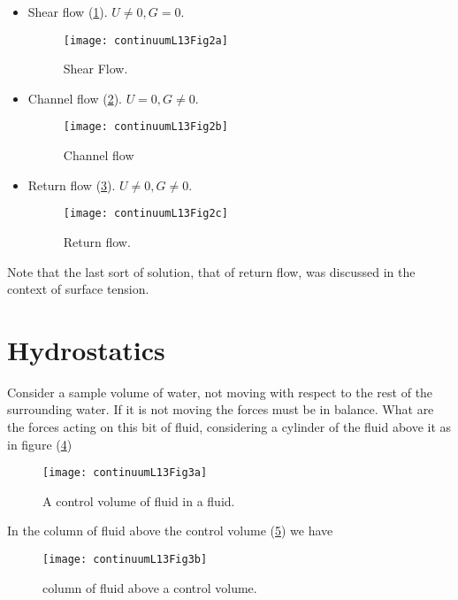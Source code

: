 \begin{itemize}
\item 
Shear flow (\ref{fig:continuumL13:continuumL13Fig2a}).  $U \ne 0, G = 0$.
\begin{figure}[htp]
   \centering
   \texttt{[image: continuumL13Fig2a]}
   \caption{Shear Flow.}\label{fig:continuumL13:continuumL13Fig2a}
\end{figure}
\item Channel flow (\ref{fig:continuumL13:continuumL13Fig2b}).  $U = 0, G \ne 0$.
\begin{figure}[htp]
   \centering
   \texttt{[image: continuumL13Fig2b]}
   \caption{Channel flow}\label{fig:continuumL13:continuumL13Fig2b}
\end{figure}
\item Return flow (\ref{fig:continuumL13:continuumL13Fig2c}).  $U \ne 0, G \ne 0$.
\begin{figure}[htp]
   \centering
   \texttt{[image: continuumL13Fig2c]}
   \caption{Return flow.}\label{fig:continuumL13:continuumL13Fig2c}
\end{figure}
\end{itemize}

Note that the last sort of solution, that of return flow, was discussed in the context of surface tension.

\section{Hydrostatics}

Consider a sample volume of water, not moving with respect to the rest of the surrounding water.  If it is not moving the forces must be in balance.  What are the forces acting on this bit of fluid, considering a cylinder of the fluid above it as in figure (\ref{fig:continuumL13:continuumL13Fig3a})
\begin{figure}[htp]
   \centering
   \texttt{[image: continuumL13Fig3a]}
   \caption{A control volume of fluid in a fluid.}\label{fig:continuumL13:continuumL13Fig3a}
\end{figure}

In the column of fluid above the control volume (\ref{fig:continuumL13:continuumL13Fig3b}) we have
\begin{figure}[htp]
   \centering
   \texttt{[image: continuumL13Fig3b]}
   \caption{column of fluid above a control volume.}\label{fig:continuumL13:continuumL13Fig3b}
\end{figure}

